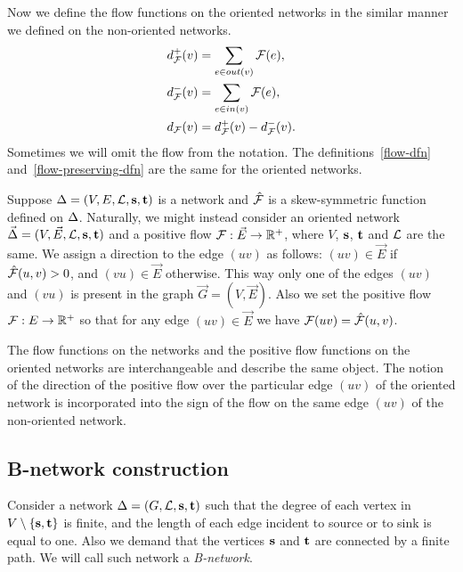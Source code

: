\documentclass[12pt,oneside,a4paper]{amsart}
\begin{document}
      Now we define the flow functions on the oriented networks in the similar manner we defined on the non-oriented networks.
      \begin{align*}
        &d^{+}_{\mathcal{F}}(v) = \sum_{e \in out(v)} \mathcal{F}(e),\\
        &d^{-}_{\mathcal{F}}(v) = \sum_{e \in in(v)} \mathcal{F}(e),\\
        &d_{\mathcal{F}}(v) = d^{+}_{\mathcal{F}}(v) - d^{-}_{\mathcal{F}}(v).
      \end{align*}
      Sometimes we will omit the flow from the notation.
      The definitions~\ref{flow-dfn} and~\ref{flow-preserving-dfn} are the same for the oriented networks.
      \bigskip

      Suppose $\Delta = (V, E, \mathcal{L}, \mathbf{s}, \mathbf{t})$ is a network and $\mathcal{\hat{F}}$ is a skew-symmetric function defined
        on $\Delta$.
      Naturally, we might instead consider an oriented network $\vec{\Delta} = (V, \vec{E}, \mathcal{L}, \mathbf{s}, \mathbf{t})$ and a
        positive flow $\mathcal{F}: \vec{E} \to \mathbb{R}^{+}$, where $V$, $\mathbf{s}$, $\mathbf{t}$ and $\mathcal{L}$ are the same.
      We assign a direction to the edge $(uv)$ as follows:
        $(uv) \in \vec{E}$ if $\mathcal{\hat{F}}(u, v) > 0$, and $(vu) \in \vec{E}$ otherwise.
      This way only one of the edges $(uv)$ and $(vu)$ is present in the graph $\vec{G} = (V, \vec{E})$.
      Also we set the positive flow $\mathcal{F}: E \to \mathbb{R}^{+}$ so that
        for any edge $(uv) \in \vec{E}$ we have $\mathcal{F}(u v) = \mathcal{\hat{F}}(u,v)$.
      \begin{remark}
        The flow functions on the networks and the positive flow functions on the oriented networks
          are interchangeable and describe the same object.
        The notion of the direction of the positive flow over the particular edge $(uv)$ of the oriented network
          is incorporated into the sign of the flow on the same edge $(uv)$ of the non-oriented network.
      \end{remark}

    \medskip
    \subsection{B-network construction}
      \begin{definition}
        Consider a network $\Delta = (G, \mathcal{L}, \mathbf{s}, \mathbf{t})$ such that
          the degree of each vertex in $V \setminus \{\mathbf{s}, \mathbf{t}\} $ is finite,
          and the length of each edge incident to source or to sink is equal to one.
        Also we demand that the vertices $\mathbf{s}$ and $\mathbf{t}$ are connected by a finite path.
        We will call such network a \emph{B-network}.
      \end{definition}
\end{document}
